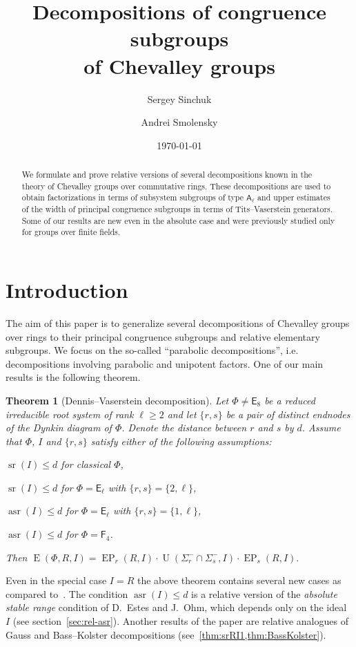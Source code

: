 \documentclass[11pt]{amsart}
\title[Decompositions of congruence subgroups of Chevalley groups]{Decompositions of congruence subgroups \\ of Chevalley groups}
\author{Sergey Sinchuk}
\author{Andrei Smolensky}
\date {\today}
\theoremstyle{plain}
\newtheorem{thm}{Theorem}
\numberwithin{equation}{section}
\numberwithin{lemma}{section}
\theoremstyle{definition}
\theoremstyle{remark}
\DeclareMathOperator{\E}{E}
\DeclareMathOperator{\EP}{EP}
\DeclareMathOperator{\U}{U}
\DeclareMathOperator{\sr}{sr}
\DeclareMathOperator{\asr}{asr}
\newcommand{\rA}{\mathsf{A}}
\newcommand{\rE}{\mathsf{E}}
\newcommand{\rF}{\mathsf{F}}
\begin{document}
\begin{abstract} 
We formulate and prove relative versions of several decompositions known in the theory of Chevalley groups over commutative rings.
These decompositions are used to obtain factorizations in terms of subsystem subgroups of type $\rA_\ell$ and 
 upper estimates of the width of principal congruence subgroups in terms of Tits--Vaserstein generators.
Some of our results are new even in the absolute case and were previously studied only for groups over finite fields.
\end{abstract}

\maketitle

\section{Introduction}\label{sec:intro}
The aim of this paper is to generalize several decompositions of Chevalley groups over rings 
 to their principal congruence subgroups and relative elementary subgroups.
We focus on the so-called ``parabolic decompositions'', i.e. decompositions involving parabolic and unipotent factors. 
One of our main results is the following theorem.
\begin{thm}[Dennis--Vaserstein decomposition]\label{thm:DennisVaserstein}
Let $\Phi \neq \rE_8$ be a reduced irreducible root system of rank $\ell\geqslant 2$ and let $\{ r, s \}$ be a pair of distinct endnodes of the Dynkin diagram of $\Phi$.
Denote the distance between $r$ and $s$ by $d$.
Assume that $\Phi$, $I$ and $\{r, s\}$ satisfy either of the following assumptions:
\begin{thmlist}
 \item $\sr(I) \leqslant d$ for classical $\Phi$,
 \item $\sr(I) \leqslant d$ for $\Phi=\rE_\ell$ with $\{r, s\} = \{ 2, \ell \}$,
 \item $\asr(I) \leqslant d$ for $\Phi=\rE_\ell$ with $\{r, s\} = \{1, \ell \}$,
 \item $\asr(I) \leqslant d$ for $\Phi=\rF_4$.
\end{thmlist}
Then $\E(\Phi, R, I) = \EP_r(R, I) \cdot \U(\Sigma^-_r \cap \Sigma^-_s, I) \cdot \EP_s(R, I).$
\end{thm}
Even in the special case $I=R$ the above theorem contains several new cases as compared to~\cite[Theorems~2.5 and~4.1]{St78}.
The condition $\asr(I) \leq d$ is a relative version of the \emph{absolute stable range} condition of D.~Estes and J.~Ohm, which depends only on the ideal $I$ (see section~\ref{sec:rel-asr}).
Another results of the paper are relative analogues of Gauss and Bass--Kolster decompositions (see~\cref{thm:srRI1,thm:BassKolster}).
\end{document}
